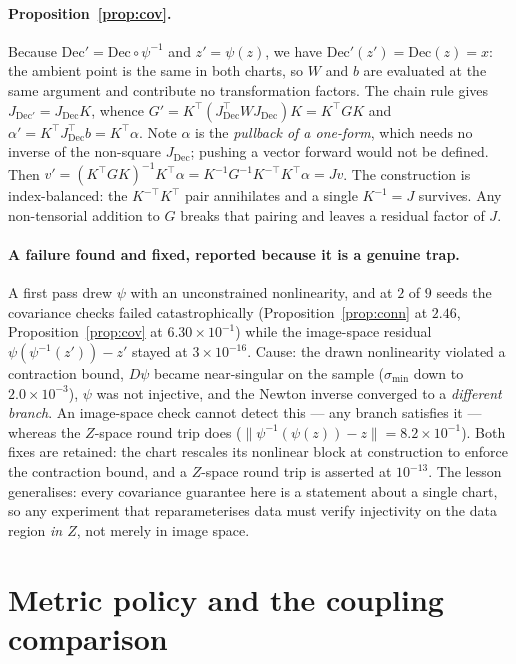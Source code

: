 \documentclass{article}
\newcommand{\Dec}{\mathrm{Dec}}
\begin{document}
\paragraph{Proposition~\ref{prop:cov}.} Because $\Dec' = \Dec\circ\psi^{-1}$ and
$z' = \psi(z)$, we have $\Dec'(z') = \Dec(z) = x$: the ambient point is the same in both
charts, so $W$ and $b$ are evaluated at the same argument and contribute no transformation
factors. The chain rule gives $J_{\Dec'} = J_{\Dec}K$, whence
$G' = K^{\top}(J_{\Dec}^{\top}WJ_{\Dec})K = K^{\top}GK$ and
$\alpha' = K^{\top}J_{\Dec}^{\top}b = K^{\top}\alpha$. Note $\alpha$ is the \emph{pullback of
a one-form}, which needs no inverse of the non-square $J_{\Dec}$; pushing a vector forward
would not be defined. Then
$v' = (K^{\top}GK)^{-1}K^{\top}\alpha = K^{-1}G^{-1}K^{-\top}K^{\top}\alpha = Jv$. The
construction is index-balanced: the $K^{-\top}K^{\top}$ pair annihilates and a single
$K^{-1} = J$ survives. Any non-tensorial addition to $G$ breaks that pairing and leaves a
residual factor of $J$.

\paragraph{A failure found and fixed, reported because it is a genuine trap.} A first pass
drew $\psi$ with an unconstrained nonlinearity, and at $2$ of $9$ seeds the covariance checks
failed catastrophically (Proposition~\ref{prop:conn} at $2.46$, Proposition~\ref{prop:cov} at
$6.30\times10^{-1}$) while the image-space residual $\psi(\psi^{-1}(z')) - z'$ stayed at
$3\times10^{-16}$. Cause: the drawn nonlinearity violated a contraction bound, $D\psi$ became
near-singular on the sample ($\sigma_{\min}$ down to $2.0\times10^{-3}$), $\psi$ was not
injective, and the Newton inverse converged to a \emph{different branch}. An image-space
check cannot detect this --- any branch satisfies it --- whereas the $Z$-space round trip
does ($\|\psi^{-1}(\psi(z)) - z\| = 8.2\times10^{-1}$). Both fixes are retained: the chart
rescales its nonlinear block at construction to enforce the contraction bound, and a
$Z$-space round trip is asserted at $10^{-13}$. The lesson generalises: every covariance
guarantee here is a statement about a single chart, so any experiment that reparameterises
data must verify injectivity on the data region \emph{in $Z$}, not merely in image space.

\section{Metric policy and the coupling comparison}
\label{app:policy}
\end{document}
